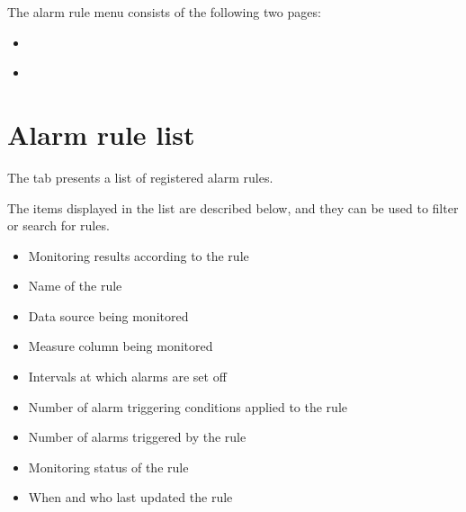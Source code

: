 \documentclass[letterpaper,10pt,english]{sphinxmanual}
\begin{document}
The alarm rule menu consists of the following two pages:
\begin{itemize}
\item {} 
{\hyperref[\detokenize{anomaly/part04/index:alarm-rule-list}]{}}

\item {} 
{\hyperref[\detokenize{anomaly/part04/index:alarm-rule-details}]{}}

\end{itemize}


\section{Alarm rule list}
\label{\detokenize{anomaly/part04/index:alarm-rule-list}}\label{\detokenize{anomaly/part04/index:id2}}
The  tab presents a list of registered alarm rules.
\begin{quote}

\begin{figure}[H]
\centering

\noindent{}
\end{figure}
\end{quote}

The items displayed in the list are described below, and they can be used to filter or search for rules.
\begin{itemize}
\item {} 
 Monitoring results according to the rule

\item {} 
 Name of the rule

\item {} 
 Data source being monitored

\item {} 
 Measure column being monitored

\item {} 
 Intervals at which alarms are set off

\item {} 
 Number of alarm triggering conditions applied to the rule

\item {} 
 Number of alarms triggered by the rule

\item {} 
 Monitoring status of the rule

\item {} 
 When and who last updated the rule

\end{itemize}
\end{document}
